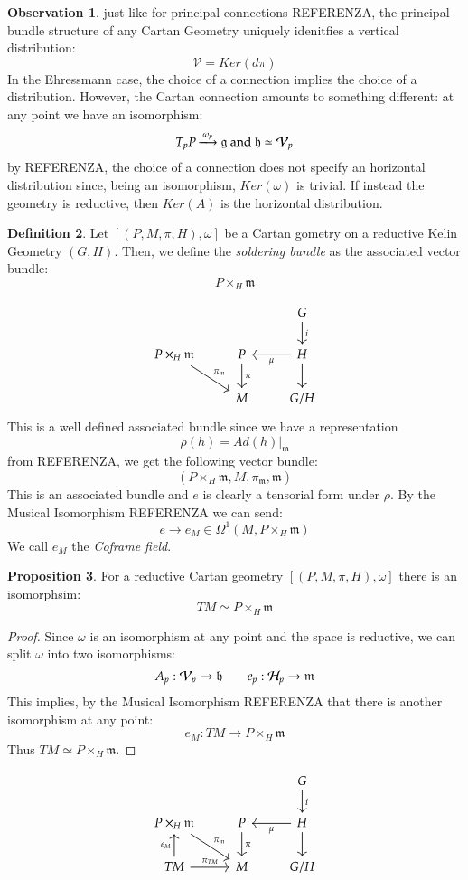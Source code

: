 \documentclass[12pt,a4paper]{report}
\theoremstyle{definition}
\newtheorem{Def}{Definition}[chapter]
\theoremstyle{Theorem}
\newtheorem{Prop}[Def]{Proposition}
\theoremstyle{break}
\theoremstyle{definition}
\newtheorem{Obs}[Def]{Observation}
\begin{document}
	\begin{Obs}
		just like for principal connections REFERENZA, the principal bundle structure of any Cartan Geometry uniquely idenitfies a vertical distribution:
		$$\mathcal{V}=Ker(d\pi)$$
		In the  Ehressmann case, the choice of a connection implies the choice of a distribution. However, the Cartan connection amounts to something different: at any point we have an isomorphism:
		$$T_pP\xlongrightarrow{\omega_p}\mathfrak{g}\hbox{ and }\mathfrak{h}\simeq\mathcal{V}_p$$ by REFERENZA, the choice of a connection does not specify an horizontal distribution since, being an isomorphism, $Ker(\omega)$ is trivial. If instead the geometry is reductive, then $Ker(A)$ is the horizontal distribution.
	\end{Obs}
	\begin{Def}
		Let $[(P,M,\pi,H),\omega]$ be a Cartan gometry on a reductive Kelin Geometry $(G,H)$. Then, we define the \textit{soldering bundle} as the associated vector bundle:
		$$P\times_{H}\mathfrak{m}$$
	\end{Def}
	$$\begin{tikzcd}
		&& G \arrow{d}{i}\\
		P\times_H \mathfrak{m}\arrow{dr}{\pi_\mathfrak{m}}&P \arrow{d}{\pi} & H \arrow{l}{\mu} \arrow{d}\\
		& M & G/H
	\end{tikzcd}$$
	This is a well defined associated bundle since we have a representation $$\rho(h)=Ad(h)|_\mathfrak{m}$$
	from REFERENZA, we get the following vector bundle:
	$$(P\times_{H}\mathfrak{m},M,\pi_{\mathfrak{m}},\mathfrak{m})$$
	This is an associated bundle and $e$ is clearly a tensorial form under $\rho$. By the Musical Isomorphism REFERENZA we can send:
	$$e\rightarrow e_M\in\Omega^1(M,P\times_{H}\mathfrak{m})$$
	We call $e_M$ the \textit{Coframe field}.
	\begin{Prop}
		For a reductive Cartan geometry $[(P,M,\pi,H),\omega]$ there is an isomorphsim:
		$$TM\simeq P\times_{H}\mathfrak{m}$$
	\end{Prop}
	\begin{proof}
		Since $\omega$ is an isomorphism at any point and the space is reductive, we can split $\omega$ into two isomorphisms:
		$$A_p:\mathcal{V}_p\rightarrow \mathfrak{h}\hspace{ 20 pt }e_p:\mathcal{H}_p\rightarrow \mathfrak{m}$$
		This implies, by the Musical Isomorphism REFERENZA that there is another isomorphism at any point:
		$$e_{M}:TM\rightarrow P\times_H\mathfrak{m}$$
		Thus $TM\simeq P\times_{H}\mathfrak{m}$.
	\end{proof}
	$$\begin{tikzcd}
		&& G \arrow{d}{i}\\
		P\times_H \mathfrak{m}\arrow{dr}{\pi_\mathfrak{m}}&P \arrow{d}{\pi} & H \arrow{l}{\mu} \arrow{d}\\
		TM \arrow{u}{e_M} \arrow{r}{\pi_{TM}}& M & G/H
	\end{tikzcd}$$
\end{document}
